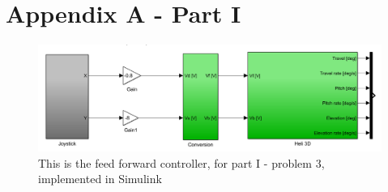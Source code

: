 \section{Appendix A - Part I}

\begin{figure}[H]
    \centering
    \includegraphics[width=1.2\textwidth]{figures/P1p3}
    \caption{This is the feed forward controller, for part I - problem 3, implemented in Simulink}
    \label{fig:P1p3}
\end{figure}